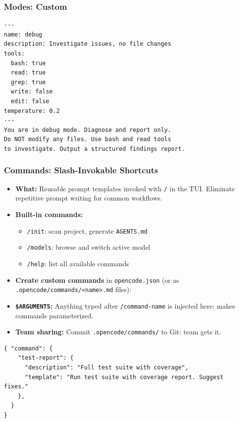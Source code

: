 \begin{frame}[fragile]\frametitle{Modes:  Custom}
\begin{lstlisting}
---
name: debug
description: Investigate issues, no file changes
tools:
  bash: true
  read: true
  grep: true
  write: false
  edit: false
temperature: 0.2
---
You are in debug mode. Diagnose and report only.
Do NOT modify any files. Use bash and read tools
to investigate. Output a structured findings report.
\end{lstlisting}  
\end{frame}
\begin{frame}[fragile]\frametitle{Commands:  Slash-Invokable Shortcuts}
  \begin{itemize}
    \item \textbf{What:} Reusable prompt templates invoked with \texttt{/} in the TUI. Eliminate repetitive prompt writing for common workflows.
    \item \textbf{Built-in commands:}
      \begin{itemize}
        \item \texttt{/init}:  scan project, generate \texttt{AGENTS.md}
        \item \texttt{/models}:  browse and switch active model
        \item \texttt{/help}:  list all available commands
      \end{itemize}
    \item \textbf{Create custom commands} in \texttt{opencode.json} (or as \texttt{.opencode/commands/<name>.md} files):

    \item \textbf{\texttt{\$ARGUMENTS}:} Anything typed after \texttt{/command-name} is injected here:  makes commands parameterized.
    \item \textbf{Team sharing:} Commit \texttt{.opencode/commands/} to Git:  team gets it.
  \end{itemize}
  
\begin{lstlisting}
{ "command": {
    "test-report": {
      "description": "Full test suite with coverage",
      "template": "Run test suite with coverage report. Suggest fixes."
    },
  }
}
\end{lstlisting}  
\end{frame}

